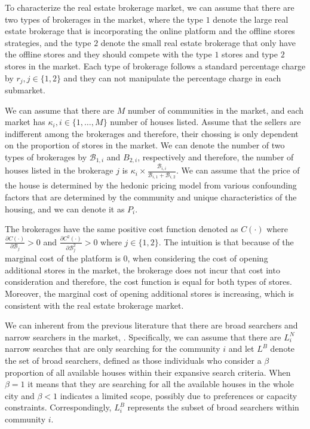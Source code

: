 \documentclass[12pt]{article}
\begin{document}
To characterize the real estate brokerage market, we can assume that there are two types of brokerages in the market, where the type $1$ denote the large real estate brokerage that is incorporating the online platform and the offline stores strategies, and the type $2$ denote the small real estate brokerage that only have the offline stores and they should compete with the type $1$ stores and type $2$ stores in the market. Each type of brokerage follows a standard percentage charge by $r_j, j \in \{1, 2\}$ and they can not manipulate the percentage charge in each submarket.

We can assume that there are $M$ number of communities in the market, and each market has $\kappa_i, i \in \{1, \ldots, M\}$ number of houses listed. Assume that the sellers are indifferent among the brokerages and therefore, their chossing is only dependent on the proportion of stores in the market. We can denote the number of two types of brokerages by $\mathcal{B}_{1, i}$ and $B_{2, i}$, respectively and therefore, the number of houses listed in the brokerage $j$ is $\kappa_{i} \times \frac{\mathcal{B}_{i, i}}{\mathcal{B}_{i, 1} + \mathcal{B}_{i, 2}}$. We can assume that the price of the house is determined by the hedonic pricing model from various confounding factors that are determined by the community and unique characteristics of the housing, and we can denote it as $P_i$. %

The brokerages have the same positive cost function denoted as $C(\cdot)$ where $\frac{\partial C(\cdot)}{\partial \mathcal{B}_{j}} > 0$ and $\frac{\partial C^2(\cdot)}{\partial \mathcal{B}_{j}^2} > 0$ where $j \in \{1, 2\}$. The intuition is that because of the marginal cost of the platform is $0$, when considering the cost of opening additional stores in the market, the brokerage does not incur that cost into consideration and therefore, the cost function is equal for both types of stores. Moreover, the marginal cost of opening additional stores is increasing, which is consistent with the real estate brokerage market.

We can inherent from the previous literature that there are broad searchers and narrow searchers in the market, \citep{10.1257/aer.20141772}. Specifically, we can assume that there are $L^N_i$ narrow searches that are only searching for the community $i$ and let $L^B$ denote the set of broad searchers, defined as those individuals who consider a $\beta$ proportion of all available houses within their expansive search criteria. When $\beta = 1$ it means that they are searching for all the available houses in the whole city and $\beta < 1$ indicates a limited scope, possibly due to preferences or capacity constraints. Correspondingly, $L^B_i$ represents the subset of broad searchers within community $i$.
\end{document}
